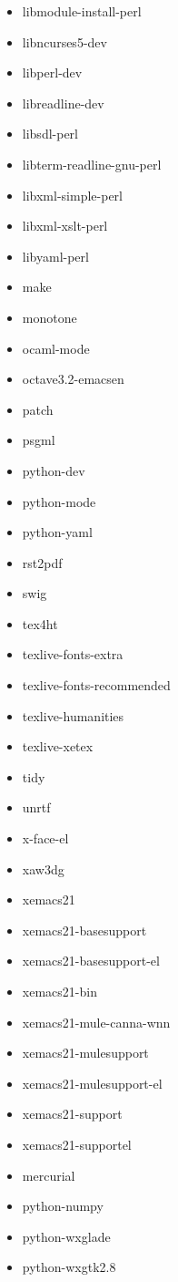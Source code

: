 \documentclass[12pt]{article}
\begin{document}
\begin{itemize}
  \item libmodule-install-perl
  \item libncurses5-dev
  \item libperl-dev
  \item libreadline-dev
  \item libsdl-perl
  \item libterm-readline-gnu-perl
  \item libxml-simple-perl
  \item libxml-xslt-perl
  \item libyaml-perl
  \item make
  \item monotone
  \item ocaml-mode
  \item octave3.2-emacsen
  \item patch
  \item psgml
  \item python-dev
  \item python-mode
  \item python-yaml
  \item rst2pdf
  \item swig
  \item tex4ht
  \item texlive-fonts-extra
  \item texlive-fonts-recommended
  \item texlive-humanities
  \item texlive-xetex
  \item tidy
  \item unrtf
  \item x-face-el
  \item xaw3dg
  \item xemacs21
  \item xemacs21-basesupport
  \item xemacs21-basesupport-el
  \item xemacs21-bin
  \item xemacs21-mule-canna-wnn
  \item xemacs21-mulesupport
  \item xemacs21-mulesupport-el
  \item xemacs21-support
  \item xemacs21-supportel


  \item mercurial
  \item python-numpy
  \item python-wxglade
  \item python-wxgtk2.8


\end{itemize}
\end{document}
